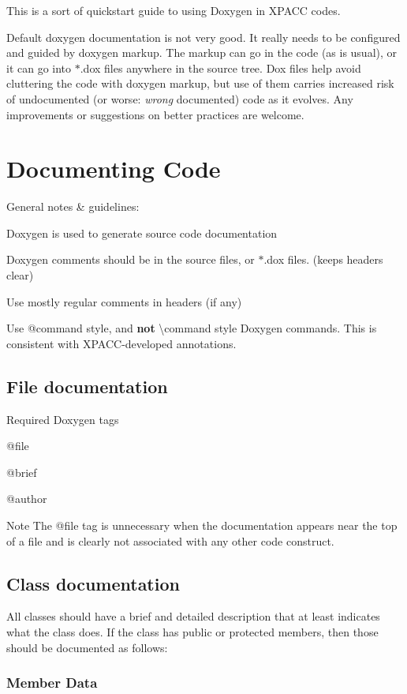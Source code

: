 This is a sort of quickstart guide to using Doxygen in X\+P\+A\+CC codes.

Default doxygen documentation is not very good. It really needs to be configured and guided by doxygen markup. The markup can go in the code (as is usual), or it can go into $\ast$.dox files anywhere in the source tree. Dox files help avoid cluttering the code with doxygen markup, but use of them carries increased risk of undocumented (or worse\+: {\itshape wrong} documented) code as it evolves. Any improvements or suggestions on better practices are welcome.\hypertarget{xpacc_documentation_guide_code_sec}{}\section{Documenting Code}\label{xpacc_documentation_guide_code_sec}
General notes \& guidelines\+:
\begin{DoxyItemize}
\item Doxygen is used to generate source code documentation
\item Doxygen comments should be in the source files, or $\ast$.dox files. (keeps headers clear)
\item Use mostly regular comments in headers (if any)
\item Use @command style, and {\bfseries not} \textbackslash{}command style Doxygen commands. This is consistent with X\+P\+A\+C\+C-\/developed annotations.
\end{DoxyItemize}\hypertarget{xpacc_documentation_guide_files_sec}{}\subsection{File documentation}\label{xpacc_documentation_guide_files_sec}
Required Doxygen tags
\begin{DoxyItemize}
\item @file
\item @brief
\item @author
\end{DoxyItemize}

\begin{DoxyNote}{Note}
The @file tag is unnecessary when the documentation appears near the top of a file and is clearly not associated with any other code construct.
\end{DoxyNote}
\hypertarget{xpacc_documentation_guide_class_sec}{}\subsection{Class documentation}\label{xpacc_documentation_guide_class_sec}
All classes should have a brief and detailed description that at least indicates what the class does. If the class has public or protected members, then those should be documented as follows\+: \hypertarget{xpacc_documentation_guide_member_data_sec}{}\subsubsection{Member Data}\label{xpacc_documentation_guide_member_data_sec}

